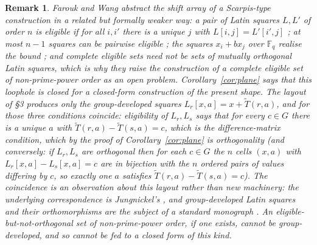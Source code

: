 \documentclass[11pt]{article}
\newtheorem{remark}{Remark}
\newcommand{\F}{\mathbb F}
\begin{document}
\begin{remark}\label{rem:lsesc}
Farouk and Wang \cite{FaroukWang2022} abstract the shift array of a
Scarpis-type construction in a related but formally weaker way: a pair of
Latin squares \(L,L'\) of order \(n\) is \emph{eligible} if for all \(i,i'\)
there is a unique \(j\) with \(L[i,j]=L'[i',j]\) \cite[Def.~2.2]{FaroukWang2022};
at most \(n-1\) squares can be pairwise eligible \cite[Thm.~2.4]{FaroukWang2022};
the squares \(x_i+bx_j\) over \(\F_q\) realise the bound
\cite[Cor.~2.5]{FaroukWang2022}; and complete eligible sets need not be sets
of mutually orthogonal Latin squares, which is why they raise the
construction of a complete eligible set of non-prime-power order as an open
problem.  Corollary~\ref{cor:plane} says that this loophole is closed for a
closed-form construction of the present shape.  The layout of \S3 produces
only the group-developed squares \(L_r[x,a]=x+\widetilde T(r,a)\), and for
those three conditions coincide: eligibility of \(L_r,L_s\) says that for
every \(c\in G\) there is a unique \(a\) with
\(\widetilde T(r,a)-\widetilde T(s,a)=c\), which is the difference-matrix
condition, which by the proof of Corollary~\ref{cor:plane} is orthogonality
(and conversely: if \(L_r,L_s\) are orthogonal then for each \(c\in G\) the
\(n\) cells \((x,a)\) with \(L_r[x,a]-L_s[x,a]=c\) are in bijection with the
\(n\) ordered pairs of values differing by \(c\), so exactly one \(a\)
satisfies \(\widetilde T(r,a)-\widetilde T(s,a)=c\)).
The coincidence is an observation about this layout rather than new
machinery: the underlying correspondence is Jungnickel's
\cite[Thm.~1]{Jungnickel1980}, and group-developed Latin squares and their
orthomorphisms are the subject of a standard monograph \cite{Evans2018}.
An eligible-but-not-orthogonal set of non-prime-power order, if one exists,
cannot be group-developed, and so cannot be fed to a closed form of this kind.
\end{remark}
\end{document}
